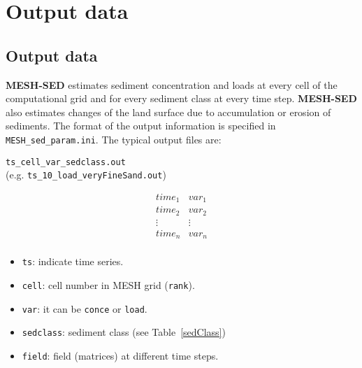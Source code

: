 \documentclass[12pt, letterpaper]{article}
\newcommand{\ms}{\textbf{MESH-SED} }
\begin{document}
\section{Output data}
\subsection{Output data}
\ms estimates sediment concentration and loads at every cell of the computational grid and for every sediment class at every time step. \ms also estimates changes of the land surface due to accumulation or erosion of sediments. The format of the output information is specified in \texttt{MESH\_sed\_param.ini}. The typical output files are:
{\tiny
\begin{center}
\texttt{ts\_cell\_var\_sedclass.out}\\
(e.g. \texttt{ts\_10\_load\_veryFineSand.out})
\end{center}
\vspace*{-2mm}
\begin{minipage}[t]{\linewidth}
$$
\begin{matrix}
time_1 & var_1 \\
time_2 & var_2 \\
\vdots & \vdots \\
time_n & var_n \\
\end{matrix}
$$
\end{minipage}

\begin{itemize}
\item \texttt{ts}: indicate time series.
\item \texttt{cell}: cell number in MESH grid (\texttt{rank}).
\item \texttt{var}: it can be \texttt{conce} or \texttt{load}.
\item \texttt{sedclass}: sediment class (see Table~\ref{sedClass})
\item \texttt{field}: field (matrices) at different time steps.
\end{itemize}
}
\end{document}

